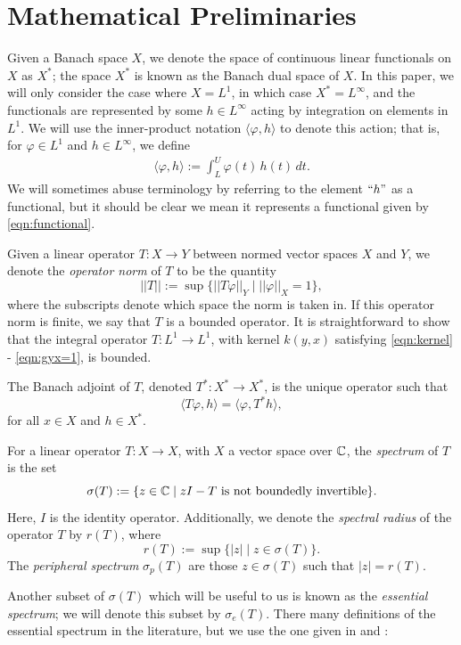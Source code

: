 \section{Mathematical Preliminaries} \label{section:mathprelims}

Given a Banach space $X$, we denote the space of continuous linear functionals on $X$ as $X^*$; the space $X^*$ is known as the Banach dual space of $X$. In this paper, we will only consider the case where $X=L^1$, in which case $X^* = L^\infty$, and the functionals are represented by some $h \in L^\infty$ acting by integration on elements in $L^1$. We will use the inner-product notation $\langle \varphi, h \rangle$ to denote this action; that is, for $\varphi \in L^1$ and $h \in L^\infty$, we define
\begin{align}
	\langle \varphi, h \rangle := \int_L^U \varphi(t) \, h(t) \, dt. \label{eqn:functional}
\end{align}
We will sometimes abuse terminology by referring to the element $``h"$ as a functional, but it should be clear we mean it represents a functional given by \eqref{eqn:functional}.

Given a linear operator $T:X \to Y$ between normed vector spaces $X$ and $Y$, we denote the \emph{operator norm} of $T$ to be the quantity
\[||T|| := \sup \{ ||T\varphi||_Y \mid ||\varphi||_X = 1\},\]
where the subscripts denote which space the norm is taken in. If this operator norm is finite, we say that $T$ is a bounded operator. It is straightforward to show that the integral operator $T:L^1 \to L^1$, with kernel $k(y, x)$ satisfying \eqref{eqn:kernel} - \eqref{eqn:gyx=1}, is bounded.

The Banach adjoint of $T$, denoted $T^*:X^* \to X^*$, is the unique operator such that
\[\langle T \varphi, h \rangle = \langle \varphi, T^*h \rangle,\]
for all $x \in X$ and $h \in X^*$.

For a linear operator $T:X \to X$, with $X$ a vector space over $\mathbb{C}$, the \emph{spectrum} of $T$ is the set
\[\sigma(T) := \{z \in \mathbb{C} \mid z I- T \text{ is not boundedly invertible}\}.\]
Here, $I$ is the identity operator. Additionally, we denote the \emph{spectral radius} of the operator $T$ by $r(T)$, where
\[r(T) := \sup \{ |z| \mid z \in \sigma(T)\}.\]
The \emph{peripheral spectrum} $\sigma_p(T)$ are those $z \in \sigma(T)$ such that $|z| = r(T)$. 

Another subset of $\sigma(T)$ which will be useful to us is known as the \emph{essential spectrum}; we will denote this subset by $\sigma_e(T)$. There many definitions of the essential spectrum in the literature, but we use the one given in \cite{Browder1961} and \cite{Edmunds1972}:

